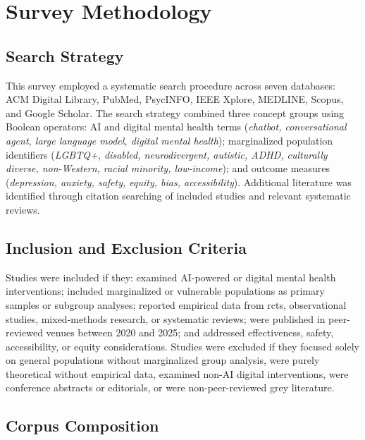 \section{Survey Methodology}

\subsection{Search Strategy}

This survey employed a systematic search procedure across seven databases: ACM Digital Library, PubMed, PsycINFO, IEEE Xplore, MEDLINE, Scopus, and Google Scholar. The search strategy combined three concept groups using Boolean operators: AI and digital mental health terms (\textit{chatbot, conversational agent, large language model, digital mental health}); marginalized population identifiers (\textit{LGBTQ+, disabled, neurodivergent, autistic, ADHD, culturally diverse, non-Western, racial minority, low-income}); and outcome measures (\textit{depression, anxiety, safety, equity, bias, accessibility}). Additional literature was identified through citation searching of included studies and relevant systematic reviews.

\subsection{Inclusion and Exclusion Criteria}

Studies were included if they: examined AI-powered or digital mental health interventions; included marginalized or vulnerable populations as primary samples or subgroup analyses; reported empirical data from \gls{rct}s, observational studies, mixed-methods research, or systematic reviews; were published in peer-reviewed venues between 2020 and 2025; and addressed effectiveness, safety, accessibility, or equity considerations. Studies were excluded if they focused solely on general populations without marginalized group analysis, were purely theoretical without empirical data, examined non-AI digital interventions, were conference abstracts or editorials, or were non-peer-reviewed grey literature.

\subsection{Corpus Composition}

